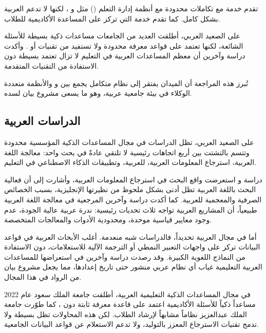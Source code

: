 تقدم  خدمة  مع تكاملات محدودة مع
أنظمة إدارة التعلم () مثل  و ، لكنها لا
تدعم العربية بشكل كامل. كما تقدم  خدمة  التي تركز على المساعدة الأكاديمية للطلاب.

على الصعيد العربي، أطلقت العديد من الجامعات مساعدات ذكية بسيطة للأسئلة
الشائعة، لكنها تعتمد على قواعد معرفة محدودة ولا تستفيد من تقنيات 
أو . وأكدت دراسة  وآخرين \cite{bourhil2025arabic} أن
معظم المساعدات العربية في التعليم لا تزال تعتمد  بسيطة دون
الاستفادة من التقنيات
المتقدمة.

تُبرز هذه المراجعة أن الميدان يفتقر إلى نظام متكامل يجمع بين  و
 والأنظمة متعددة الوكلاء في بيئة جامعية عربية، وهو ما يسعى مشروع
بيان لسده.

\subsection{الدراسات العربية}
\label{subsec:related-arabic}
على الصعيد العربي، تظل الدراسات في مجال المساعدات الذكية المؤسسية محدودة
وتتسم بالتشتت بين أربع اتجاهات رئيسية لا تلتقي عادةً في بحث واحد: معالجة
اللغة العربية، استرجاع المعلومات العربية،  للعربية، وتطبيقات
الذكاء الاصطناعي في التعليم.

دراسة  و \cite{darwish2014arabicir} استعرضت واقع البحث في
استرجاع المعلومات العربية، وأشارت إلى أن فعالية البحث باللغة العربية تظل
أدنى بشكل ملحوظ من نظيرتها الإنجليزية، بسبب الخصائص الصرفية والمعجمية
للعربية. كما أكدت دراسة  وآخرين
\cite{guellil2021arabic} المرجعية في معالجة اللغة العربية طبيعياً، أن المشاريع
العربية تواجه ثلاث تحديات رئيسية: ندرة  عربية عالية الجودة، عدم
وجود معايير قياسية موحدة، ومحدودية الأدوات والمعالجات المتخصصة.

أما في مجال  العربية تحديداً، فالدراسات شبه منعدمة. أغلب الأبحاث
العربية في قواعد البيانات تركز على واجهات التعبير النمطي أو الترجمة الآلية
للاستعلامات، دون الاستفادة من النماذج اللغوية الكبيرة. وقد رصدت دراسة
 وآخرين \cite{bourhil2025arabic} في استعراضها للمساعدات العربية
التعليمية غياب أي نظام  عربي منشور حتى تاريخ إعدادها، مما يجعل
مشروع بيان من الرواد في هذا المجال.

في مجال المساعدات الذكية التعليمية العربية، أطلقت جامعة الملك سعود عام 2022
مساعداً ذكياً للأسئلة الأكاديمية اعتمد على قاعدة معرفة ثابتة دون ،
كما طوّرت جامعة الملك عبدالعزيز نظاماً مشابهاً لإرشاد الطلاب. لكن هذه
المحاولات تظل بسيطة ولا تدمج تقنيات الاسترجاع المعزز بالتوليد، ولا تدعم
الاستعلام عن قواعد البيانات الجامعية.

